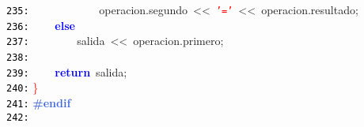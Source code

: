 \documentclass[a4paper,10pt]{scrartcl}
\begin{document}
{   \mbox{}\texttt{\textcolor{Black}{235:}} \ \ \ \ \ \ \ \ \ \ \ \ operacion\textcolor{BrickRed}{.}segundo\ \textcolor{BrickRed}{\textless{}\textless{}}\ \texttt{\textcolor{Red}{'='}}\ \textcolor{BrickRed}{\textless{}\textless{}}\ operacion\textcolor{BrickRed}{.}resultado\textcolor{BrickRed}{;} \\
   \mbox{}\texttt{\textcolor{Black}{236:}} \ \ \ \ \textbf{\textcolor{Blue}{else}}\  \\
   \mbox{}\texttt{\textcolor{Black}{237:}} \ \ \ \ \ \ \ \ salida\ \textcolor{BrickRed}{\textless{}\textless{}}\ operacion\textcolor{BrickRed}{.}primero\textcolor{BrickRed}{;} \\
   \mbox{}\texttt{\textcolor{Black}{238:}} \ \ \ \  \\
   \mbox{}\texttt{\textcolor{Black}{239:}} \ \ \ \ \textbf{\textcolor{Blue}{return}}\ salida\textcolor{BrickRed}{;} \\
   \mbox{}\texttt{\textcolor{Black}{240:}} \textcolor{Red}{\}} \\
   \mbox{}\texttt{\textcolor{Black}{241:}} \textbf{\textcolor{RoyalBlue}{\#endif}} \\
   \mbox{}\texttt{\textcolor{Black}{242:}} 
   }
   
   
   
   
   
   
\end{document}
